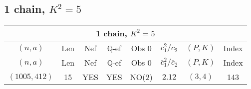 \subsection{1 chain, $K^2 = 5$}
\begin{longtable}{|c|c|c|c|c|c|c|c|}
\hline
\multicolumn{8}{|c|}{1 chain, $K^2 = 5$}\\
\hline
$(n,a)$ & Len & Nef & $\mathbb Q$-ef & Obs 0 & $\overline c_1^2 / \overline c_2$ & $(P,K)$ & Index\\
\hline
\endfirsthead

\hline
$(n,a)$ & Len & Nef & $\mathbb Q$-ef & Obs 0 & $\overline c_1^2 / \overline c_2$ & $(P,K)$ & Index\\
\hline
\endhead
\hline
\endfoot

$(1005,412)$ & 15 & YES & YES & NO(2) & $2.12$ & $(3,4)$ & 143
\end{longtable}
